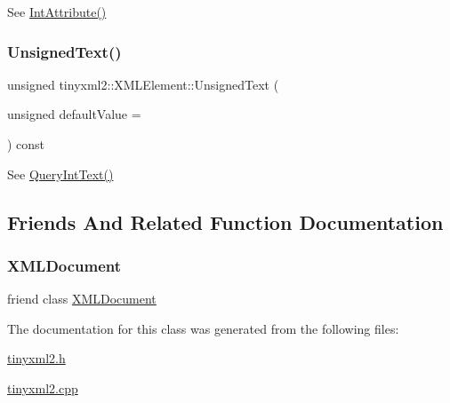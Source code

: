See \mbox{\hyperlink{classtinyxml2_1_1_x_m_l_element_a95a89b13bb14a2d4655e2b5b406c00d4}{Int\+Attribute()}} 

\mbox{\label{classtinyxml2_1_1_x_m_l_element_a49bad014ffcc17b0b6119d5b2c97dfb5}} 
\subsubsection{\texorpdfstring{Unsigned\+Text()}{UnsignedText()}}
{\footnotesize\ttfamily unsigned tinyxml2\+::\+X\+M\+L\+Element\+::\+Unsigned\+Text (\begin{DoxyParamCaption}\item[{unsigned}]{default\+Value = {} }\end{DoxyParamCaption}) const}



See \mbox{\hyperlink{classtinyxml2_1_1_x_m_l_element_a926357996bef633cb736e1a558419632}{Query\+Int\+Text()}} 



\subsection{Friends And Related Function Documentation}
\mbox{\label{classtinyxml2_1_1_x_m_l_element_a4eee3bda60c60a30e4e8cd4ea91c4c6e}} 
\subsubsection{\texorpdfstring{X\+M\+L\+Document}{XMLDocument}}
{\footnotesize\ttfamily friend class \mbox{\hyperlink{classtinyxml2_1_1_x_m_l_document}{X\+M\+L\+Document}}\hspace{0.3cm}{\ttfamily [friend]}}



The documentation for this class was generated from the following files\+:\begin{DoxyCompactItemize}
\item 
\mbox{\hyperlink{tinyxml2_8h}{tinyxml2.\+h}}\item 
\mbox{\hyperlink{tinyxml2_8cpp}{tinyxml2.\+cpp}}\end{DoxyCompactItemize}
